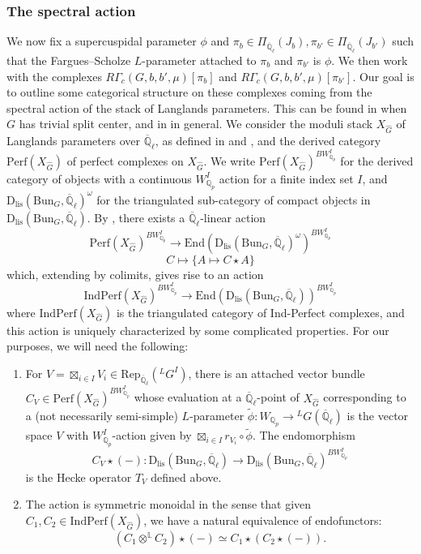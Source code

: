\documentclass[reqno,11pt]{amsart}
\theoremstyle{remark}
\newcommand{\Q}{\mathbb{Q}}
\newcommand{\ov}{\overline}
\newcommand{\Bun}{\mathrm{Bun}}
\newcommand{\Rep}{\mathrm{Rep}}
\newcommand{\Dlis}{\mathrm{D}_{\mathrm{lis}}}
\newcommand{\Perf}{\mathrm{Perf}}
\newcommand{\IndPerf}{\mathrm{IndPerf}}
\def\ol{\overline}
\def\ra{\rightarrow}
\begin{document}
\subsubsection{The spectral action}{\label{sss: spectralaction}}
We now fix a supercuspidal parameter $\phi$ and $\pi_{b} \in \Pi_{\ov{\Q}_{\ell}}(J_b), \pi_{b'} \in \Pi_{\ov{\Q}_{\ell}}(J_{b'})$ such that the Fargues--Scholze $L$-parameter attached to $\pi_{b}$ and $\pi_{b'}$ is $\phi$. We then work with the complexes $R\Gamma_{c}(G,b,b',\mu)[\pi_{b}]$ and $R\Gamma_{c}(G,b,b',\mu)[\pi_{b'}]$. Our goal is to outline some categorical structure on these complexes coming from the spectral action of the stack of Langlands parameters. This can be found in  \cite[Section~X.2]{FS} when $G$ has trivial split center, and in \cite[Section~3.2]{Ham} in general. We consider the moduli stack $X_{\hat{G}}$ of Langlands parameters over $\ol{\mathbb{Q}}_{\ell}$, as defined in \cite{DH,Zhu1} and \cite[Section~VIII.I]{FS}, and the derived category $\Perf(X_{\hat{G}})$ of perfect complexes on $X_{\hat{G}}$. We write $\Perf(X_{\hat{G}})^{BW_{\mathbb{Q}_{p}}^{I}}$ for the derived category of objects with a continuous $W_{\mathbb{Q}_{p}}^{I}$ action for a finite index set $I$, and $\Dlis(\Bun_{G},\ol{\mathbb{Q}}_{\ell})^{\omega}$ for the triangulated sub-category of compact objects in $\Dlis(\Bun_{G},\ol{\mathbb{Q}}_{\ell})$. By \cite[Corollary~X.I.3]{FS}, there exists a $\ol{\mathbb{Q}}_{\ell}$-linear action 
\[ \Perf(X_{\hat{G}})^{BW_{\mathbb{Q}_{p}}^{I}} \ra \mathrm{End}(\Dlis(\Bun_{G},\ol{\mathbb{Q}}_{\ell})^{\omega})^{BW_{\mathbb{Q}_{p}}^{I}} \]
\[ C \mapsto \{A \mapsto C \star A\}\]
which, extending by colimits, gives rise to an action 
\[ \IndPerf(X_{\hat{G}})^{BW_{\mathbb{Q}_{p}}^{I}} \ra \mathrm{End}(\Dlis(\Bun_{G},\ol{\mathbb{Q}}_{\ell}))^{BW_{\mathbb{Q}_{p}}^{I}} \]
where $\IndPerf(X_{\hat{G}})$ is the triangulated category of Ind-Perfect complexes, and this action is uniquely characterized by some complicated properties. For our purposes, we will need the following:
\begin{enumerate}
    \item For $V = \boxtimes_{i \in I} V_{i}\in \Rep_{\ol{\mathbb{Q}}_{\ell}}(\phantom{}^{L}G^{I})$, there is an attached vector bundle $C_{V} \in \Perf(X_{\hat{G}})^{BW_{\mathbb{Q}_{p}}^{I}}$ whose evaluation at a $\ol{\mathbb{Q}}_{\ell}$-point of $X_{\hat{G}}$ corresponding to a (not necessarily semi-simple) $L$-parameter $\tilde{\phi}: W_{\mathbb{Q}_{p}} \ra \phantom{}^{L}G(\ol{\mathbb{Q}}_{\ell})$ is the vector space $V$ with $W_{\mathbb{Q}_{p}}^{I}$-action given by $\boxtimes_{i \in I} r_{V_{i}} \circ \tilde{\phi}$. The endomorphism
    \[ C_{V} \star (-): \Dlis(\Bun_{G},\ol{\mathbb{Q}}_{\ell}) \ra \Dlis(\Bun_{G},\ol{\mathbb{Q}}_{\ell})^{BW_{\mathbb{Q}_{p}}^{I}} \]
    is the Hecke operator $T_{V}$ defined above.  
    \item The action is symmetric monoidal in the sense that given $C_{1},C_{2} \in \IndPerf(X_{\hat{G}})$, we have a natural equivalence of endofunctors: 
    \[ (C_{1} \otimes^{\mathbb{L}} C_{2}) \star (-) \simeq C_{1} \star (C_{2} \star (-)). \]
\end{enumerate}
\end{document}

